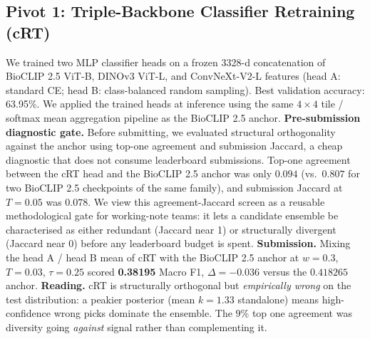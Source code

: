 \documentclass[sigconf]{ceurart}
\begin{document}
\subsection{Pivot 1: Triple-Backbone Classifier Retraining (cRT)}
\label{sec:pivot1}
We trained two MLP classifier heads on a frozen 3328-d concatenation of BioCLIP 2.5 ViT-B, DINOv3 ViT-L, and ConvNeXt-V2-L features (head A: standard CE; head B: class-balanced random sampling). Best validation accuracy: 63.95\%. We applied the trained heads at inference using the same $4{\times}4$ tile / softmax mean aggregation pipeline as the BioCLIP 2.5 anchor.
\textbf{Pre-submission diagnostic gate.} Before submitting, we evaluated structural orthogonality against the anchor using top-one agreement and submission Jaccard, a cheap diagnostic that does not consume leaderboard submissions. Top-one agreement between the cRT head and the BioCLIP 2.5 anchor was only $0.094$ (vs.\ $0.807$ for two BioCLIP 2.5 checkpoints of the same family), and submission Jaccard at $T{=}0.05$ was $0.078$. We view this agreement-Jaccard screen as a reusable methodological gate for working-note teams: it lets a candidate ensemble be characterised as either redundant (Jaccard near 1) or structurally divergent (Jaccard near 0) before any leaderboard budget is spent.
\textbf{Submission.} Mixing the head A / head B mean of cRT with the BioCLIP 2.5 anchor at $w{=}0.3$, $T{=}0.03$, $\tau{=}0.25$ scored \textbf{0.38195} Macro F1, $\Delta = -0.036$ versus the $0.418265$ anchor.
\textbf{Reading.} cRT is structurally orthogonal but \emph{empirically wrong} on the test distribution: a peakier posterior (mean $k{=}1.33$ standalone) means high-confidence wrong picks dominate the ensemble. The $9\%$ top one agreement was diversity going \emph{against} signal rather than complementing it.
\end{document}
